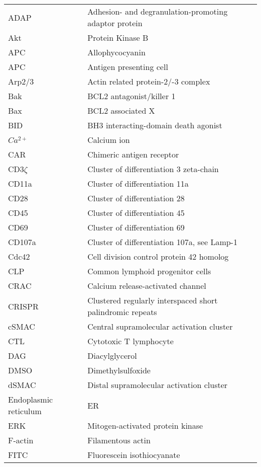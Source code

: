 \documentclass[phd,tocprelim]{cornell}
\renewcommand{\caption}[1]{\singlespacing\hangcaption{#1}\normalspacing}
\begin{document}
\abbrlist
\begin{longtable}{ p{} p{} }
	ADAP & Adhesion- and degranulation-promoting adaptor protein \\	
	Akt & Protein Kinase B \\
	APC & Allophycocyanin \\
	APC & Antigen presenting cell \\
	Arp2/3 	& Actin related protein-2/-3 complex \\
	Bak & BCL2 antagonist/killer 1 \\
	Bax & BCL2 associated X \\
	BID & BH3 interacting-domain death agonist \\
	$Ca^{2+}$ & Calcium ion \\
	CAR & Chimeric antigen receptor \\
	CD3$\zeta$ & Cluster of differentiation 3 zeta-chain \\
	CD11a & Cluster of differentiation 11a \\
	CD28 & Cluster of differentiation 28 \\
	CD45 & Cluster of differentiation 45 \\
	CD69 & Cluster of differentiation 69 \\
	CD107a & Cluster of differentiation 107a, see Lamp-1 \\
	Cdc42 & Cell division control protein 42 homolog \\
	CLP & Common lymphoid progenitor cells \\
	CRAC &  Calcium release-activated channel \\
	CRISPR & Clustered regularly interspaced short palindromic repeats \\
	cSMAC & Central supramolecular activation cluster \\
	CTL & Cytotoxic T lymphocyte \\
	DAG & Diacylglycerol \\
	DMSO & Dimethylsulfoxide \\
	dSMAC & Distal supramolecular activation cluster \\
	Endoplasmic reticulum & ER \\	
	ERK  & Mitogen-activated protein kinase \\
	F-actin & Filamentous actin \\
	FITC & Fluorescein isothiocyanate \\

\end{longtable}
\end{document}
